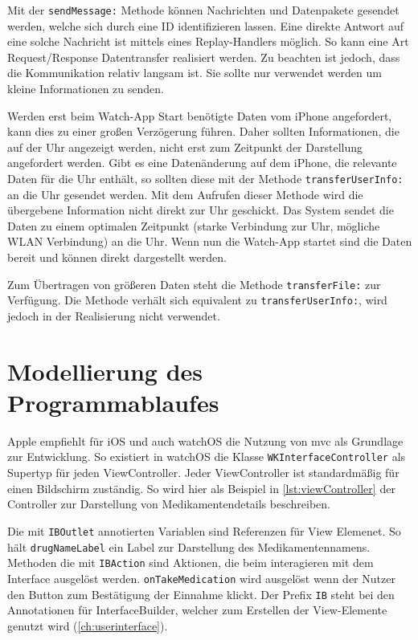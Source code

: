 
 

Mit der \lstinline{sendMessage:} Methode können Nachrichten und Datenpakete gesendet werden, welche sich durch eine ID identifizieren lassen. Eine direkte Antwort auf eine solche Nachricht ist mittels eines Replay-Handlers möglich. So kann eine Art Request/Response Datentransfer realisiert werden. Zu beachten ist jedoch, dass die Kommunikation relativ langsam ist. Sie sollte nur verwendet werden um kleine Informationen zu senden.

Werden erst beim Watch-App Start benötigte Daten vom iPhone angefordert, kann dies zu einer großen Verzögerung führen. Daher sollten Informationen, die auf der Uhr angezeigt werden, nicht erst zum Zeitpunkt der Darstellung angefordert werden. Gibt es eine Datenänderung auf dem iPhone, die relevante Daten für die Uhr enthält, so sollten diese mit der Methode \lstinline{transferUserInfo:}  an die Uhr gesendet werden. Mit dem Aufrufen dieser Methode wird die übergebene Information nicht direkt zur Uhr geschickt. Das System sendet die Daten zu einem optimalen Zeitpunkt (starke Verbindung zur Uhr, mögliche WLAN Verbindung) an die Uhr. Wenn nun die Watch-App startet sind die Daten bereit und können direkt dargestellt werden.

Zum Übertragen von größeren Daten steht die Methode \lstinline{transferFile:} zur Verfügung. Die Methode verhält sich equivalent zu \lstinline{transferUserInfo:}, wird jedoch in der Realisierung nicht verwendet.

\section{Modellierung des Programmablaufes}
Apple empfiehlt für iOS und auch watchOS die Nutzung von \gls{mvc} als Grundlage zur Entwicklung. So existiert in watchOS die Klasse \lstinline{WKInterfaceController} als Supertyp für jeden ViewController. Jeder ViewController ist standardmäßig für einen Bildschirm zuständig. So wird hier als Beispiel in \ref{lst:viewController}  der Controller zur Darstellung von Medikamentendetails beschreiben.

Die mit \lstinline{IBOutlet} annotierten Variablen sind Referenzen für View Elemenet. So hält \lstinline{drugNameLabel} ein Label zur Darstellung des Medikamentennamens. Methoden die mit \lstinline{IBAction} sind Aktionen, die beim interagieren mit dem Interface ausgelöst werden. \lstinline{onTakeMedication} wird ausgelöst wenn der Nutzer den Button zum Bestätigung der Einnahme klickt. Der Prefix \lstinline{IB} steht bei den Annotationen für InterfaceBuilder, welcher zum Erstellen der View-Elemente genutzt wird (\ref{ch:userinterface}).


